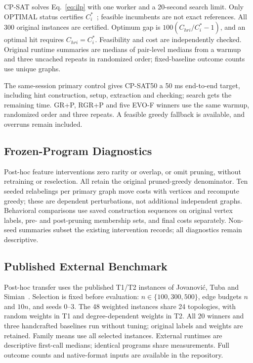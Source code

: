 CP-SAT solves Eq.~\eqref{eq:ilp} with one worker and a 20-second search
limit. Only OPTIMAL status certifies $C_i^*$~\cite{cpsat}; feasible
incumbents are not exact references. All 300 original instances are
certified. Optimum gap is $100(C_{hri}/C_i^*-1)$, and an optimal hit
requires $C_{hri}=C_i^*$. Feasibility and cost are independently checked.
Original runtime summaries are medians of pair-level medians from a warmup
and three uncached repeats in randomized order; fixed-baseline outcome
counts use unique graphs.

The same-session primary control gives CP-SAT50 a 50 ms end-to-end target,
including hint construction, setup, extraction and checking; search gets
the remaining time. GR+P, RGR+P and five EVO-F winners use the same warmup,
randomized order and three repeats. A feasible greedy fallback is available,
and overruns remain included.

\subsection{Frozen-Program Diagnostics}
Post-hoc feature interventions zero rarity or overlap, or omit pruning,
without retraining or reselection. All retain the original pruned-greedy
denominator. Ten seeded relabelings per primary graph move costs with
vertices and recompute greedy; these are dependent perturbations, not
additional independent graphs. Behavioral comparisons use saved construction
sequences on original vertex labels, pre- and post-pruning membership sets,
and final costs separately. Non-seed summaries subset the existing
intervention records; all diagnostics remain descriptive.


\subsection{Published External Benchmark}
Post-hoc transfer uses the published T1/T2 instances of
Jovanovi\'{c}, Tuba and Simian~\cite{jovanovic2010}. Selection is fixed
before evaluation: $n\in\{100,300,500\}$, edge budgets $n$ and $10n$,
and seeds 0--3. The 48 weighted instances share 24 topologies, with random
weights in T1 and degree-dependent weights in T2. All 20 winners and
three handcrafted baselines run without tuning; original labels and weights
are retained. Family means use all selected instances. External runtimes
are descriptive first-call medians; identical programs share measurements.
Full outcome counts and native-format inputs are available in the repository.
